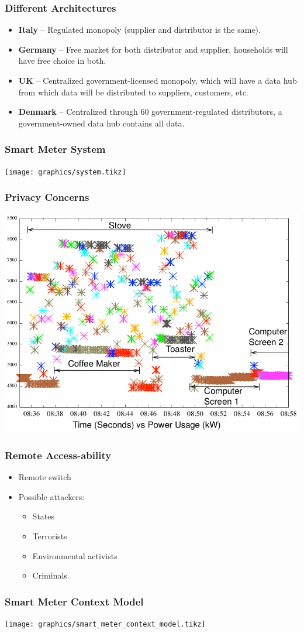 \begin{frame}
  \frametitle{Different Architectures}
  \begin{itemize}
	\item \textbf{Italy} -- Regulated monopoly (supplier and distributor is the same).
	\item \textbf{Germany} -- Free market for both distributor and supplier, households will have free choice in both.
	\item \textbf{UK} -- Centralized government-licensed monopoly, which will have a data hub from which data will be distributed to suppliers, customers, etc.
	\item \textbf{Denmark} -- Centralized through 60 government-regulated distributors, a government-owned data hub contains all data.
\end{itemize}

\end{frame}

\begin{frame}
  \frametitle{Smart Meter System}
  \texttt{[image: graphics/system.tikz]}
\end{frame}

\begin{frame}
  \frametitle{Privacy Concerns}
  \includegraphics[width=.8\textwidth]{graphics/detailed.png}
\end{frame}

\begin{frame}
  \frametitle{Remote Access-ability}
  \begin{itemize}
  \item Remote switch
  \item Possible attackers:
    \begin{itemize}
    \item States
    \item Terrorists
    \item Environmental activists
    \item Criminals
    \end{itemize}
  \end{itemize}
\end{frame}

\begin{frame}
  \frametitle{Smart Meter Context Model}
  \texttt{[image: graphics/smart\_meter\_context\_model.tikz]}
\end{frame}
